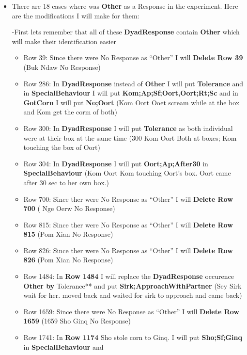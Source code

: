 \documentclass[
]{article}
\providecommand{\tightlist}{%
  \setlength{\itemsep}{0pt}\setlength{\parskip}{0pt}}
\begin{document}
\begin{itemize}
\item
  There are 18 cases where was \textbf{Other} as a Response in the
  experiment. Here are the modifications I will make for them:

  -First lets remember that all of these \textbf{DyadResponse} contain
  \textbf{Other} which will make their identification easier

  \begin{itemize}
  \tightlist
  \item
    Row 39: Since there were No Response as ``Other'' I will
    \textbf{Delete Row 39} (Buk Ndaw No Response)
  \item
    Row 286: In \textbf{DyadResponse} instead of \textbf{Other} I will
    put \textbf{Tolerance} and in \textbf{SpecialBehaviour} I will put
    \textbf{Kom;Ap;Sf;Oort,Oort;Rt;Sc} and in \textbf{GotCorn} I will
    put \textbf{No;Oort} (Kom Oort Ooet scream while at the box and Kom
    get the corm of both)
  \item
    Row 300: In \textbf{DyadResponse} I will put \textbf{Tolerance} as
    both individual were at their box at the same time (300 Kom Oort
    Both at boxes; Kom touching the box of Oort)
  \item
    Row 304: In \textbf{DyadResponse} I will put
    \textbf{Oort;Ap;After30} in \textbf{SpecialBehaviour} (Kom Oort Kom
    touching Oort's box. Oort came after 30 sec to her own box.)
  \item
    Row 700: Since ther were No Response as ``Other'' I will
    \textbf{Delete Row 700} ( Nge Oerw No Response)
  \item
    Row 815: Since ther were No Response as ``Other'' I will
    \textbf{Delete Row 815} (Pom Xian No Response)
  \item
    Row 826: Since ther were No Response as ``Other'' I will
    \textbf{Delete Row 826} (Pom Xian No Response)
  \item
    Row 1484: In \textbf{Row 1484} I will replace the
    \textbf{DyadResponse} occurence \textbf{Other by }Tolerance** and
    put \textbf{Sirk;ApproachWithPartner} (Sey Sirk wait for her. moved
    back and waited for sirk to approach and came back)
  \item
    Row 1659: Since there were No Response as ``Other'' I will
    \textbf{Delete Row 1659} (1659 Sho Ginq No Response)
  \item
    Row 1741: In \textbf{Row 1174} Sho stole corn to Ginq. I will put
    \textbf{Sho;Sf;Ginq} in \textbf{SpecialBehaviour} and

\end{itemize}
\end{itemize}
\end{document}
